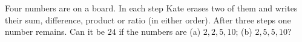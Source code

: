 Four numbers are on a board. In each step Kate erases two of them and writes their sum, difference, product or ratio (in either order). After three steps one number remains. Can it be $24$ if the numbers are (a) $2,2,5,10$; (b) $2,5,5,10$?
